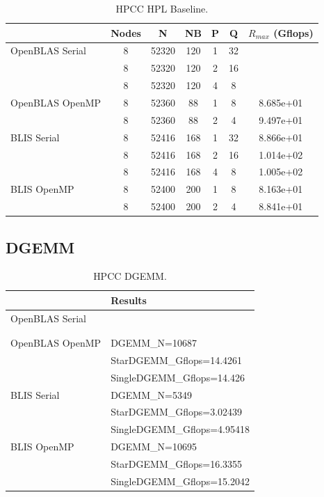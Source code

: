 \documentclass{report}
\begin{document}
\begin{table}[H]
\begin{center}
\begin{tabular}{ |l|c|c|c|c|c|c| } 
\hline
                & Nodes & N & NB & P & Q & $R_{max}$ (Gflops) \\ 
\hline
OpenBLAS Serial & 8 & 52320 & 120 & 1 & 32 & \\ 
                & 8 & 52320 & 120 & 2 & 16 & \\ 
                & 8 & 52320 & 120 & 4 & 8  & \\ 
\hline
OpenBLAS OpenMP & 8 & 52360 &  88 & 1 & 8  & 8.685e+01 \\ 
                & 8 & 52360 &  88 & 2 & 4  & 9.497e+01 \\ 
\hline
BLIS Serial     & 8 & 52416 & 168 & 1 & 32 & 8.866e+01 \\ 
                & 8 & 52416 & 168 & 2 & 16 & 1.014e+02 \\ 
                & 8 & 52416 & 168 & 4 & 8  & 1.005e+02 \\ 
\hline
BLIS OpenMP     & 8 & 52400 & 200 & 1 & 8  & 8.163e+01 \\ 
                & 8 & 52400 & 200 & 2 & 4  & 8.841e+01 \\ 
\hline
\end{tabular}
\end{center}
\caption{\label{tab:table-name}HPCC HPL Baseline.}
\end{table}


%
%
\subsection{DGEMM}

\begin{table}[H]
\begin{center}
\begin{tabular}{ |l|l| } 
\hline
                & Results \\ 
\hline
OpenBLAS Serial & \\ 
                & \\ 
                & \\ 
\hline
OpenBLAS OpenMP & DGEMM\_N=10687 \\
                & StarDGEMM\_Gflops=14.4261 \\
                & SingleDGEMM\_Gflops=14.426 \\
\hline
BLIS Serial     & DGEMM\_N=5349 \\
                & StarDGEMM\_Gflops=3.02439 \\
                & SingleDGEMM\_Gflops=4.95418 \\
\hline
BLIS OpenMP     & DGEMM\_N=10695 \\
                & StarDGEMM\_Gflops=16.3355 \\
                & SingleDGEMM\_Gflops=15.2042 \\
\hline
\end{tabular}
\end{center}
\caption{\label{tab:table-name}HPCC DGEMM.}
\end{table}
\end{document}
